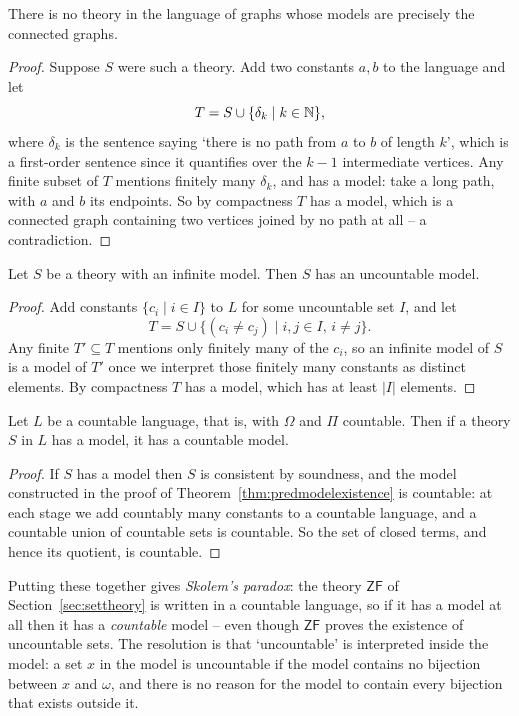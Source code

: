 \documentclass[a4paper]{scrartcl}
\newcommand{\ZF}{\mathsf{ZF}}
\begin{document}
\begin{corollary}
  There is no theory in the language of graphs whose models are precisely the connected graphs.
\end{corollary}
\begin{proof}
  Suppose $S$ were such a theory. Add two constants $a, b$ to the language and let
  $$T = S \cup \{\delta_k \mid k \in \mathbb{N}\},$$
  where $\delta_k$ is the sentence saying `there is no path from $a$ to $b$ of length $k$', which is a first-order sentence since it quantifies over the $k-1$ intermediate vertices. Any finite subset of $T$ mentions finitely many $\delta_k$, and has a model: take a long path, with $a$ and $b$ its endpoints. So by compactness $T$ has a model, which is a connected graph containing two vertices joined by no path at all -- a contradiction.
\end{proof}

\begin{theorem}
  Let $S$ be a theory with an infinite model. Then $S$ has an uncountable model.
\end{theorem}
\begin{proof}
  Add constants $\{c_i \mid i \in I\}$ to $L$ for some uncountable set $I$, and let
  $$T = S \cup \{(c_i \neq c_j) \mid i, j \in I, \, i \neq j\}.$$
  Any finite $T' \subseteq T$ mentions only finitely many of the $c_i$, so an infinite model of $S$ is a model of $T'$ once we interpret those finitely many constants as distinct elements. By compactness $T$ has a model, which has at least $|I|$ elements.
\end{proof}

\begin{theorem}
  Let $L$ be a countable language, that is, with $\Omega$ and $\Pi$ countable. Then if a theory $S$ in $L$ has a model, it has a countable model.
\end{theorem}
\begin{proof}
  If $S$ has a model then $S$ is consistent by soundness, and the model constructed in the proof of Theorem~\ref{thm:predmodelexistence} is countable: at each stage we add countably many constants to a countable language, and a countable union of countable sets is countable. So the set of closed terms, and hence its quotient, is countable.
\end{proof}

Putting these together gives \emph{Skolem's paradox}: the theory $\ZF$ of Section~\ref{sec:settheory} is written in a countable language, so if it has a model at all then it has a \emph{countable} model -- even though $\ZF$ proves the existence of uncountable sets. The resolution is that `uncountable' is interpreted inside the model: a set $x$ in the model is uncountable if the model contains no bijection between $x$ and $\omega$, and there is no reason for the model to contain every bijection that exists outside it.
\end{document}
